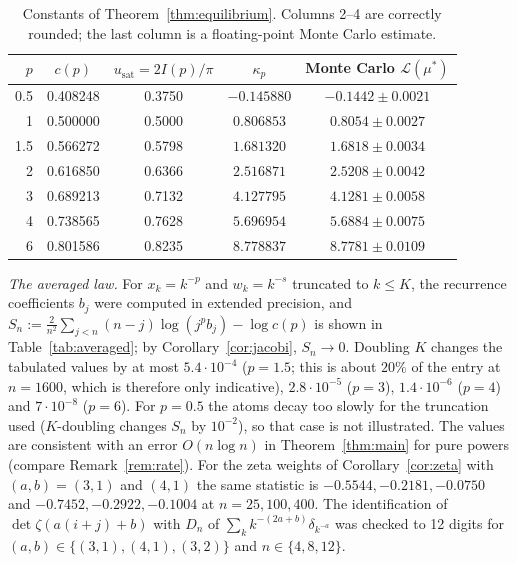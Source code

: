 \documentclass{amsart}
\theoremstyle{definition}
\theoremstyle{remark}
\numberwithin{equation}{section}
\newcommand{\cL}{\mathcal{L}}
\newcommand{\usat}{u_{\mathrm{sat}}}
\begin{document}
\begin{table}[ht]
\centering
\begin{tabular}{rcccc}
\hline
$p$ & $c(p)$ & $\usat=2I(p)/\pi$ & $\kappa_p$ & Monte Carlo $\cL(\mu^*)$\\
\hline
0.5 & 0.408248 & 0.3750 & $-0.145880$ & $-0.1442\pm0.0021$\\
1   & 0.500000 & 0.5000 & $0.806853$ & $0.8054\pm0.0027$\\
1.5 & 0.566272 & 0.5798 & $1.681320$ & $1.6818\pm0.0034$\\
2   & 0.616850 & 0.6366 & $2.516871$ & $2.5208\pm0.0042$\\
3   & 0.689213 & 0.7132 & $4.127795$ & $4.1281\pm0.0058$\\
4   & 0.738565 & 0.7628 & $5.696954$ & $5.6884\pm0.0075$\\
6   & 0.801586 & 0.8235 & $8.778837$ & $8.7781\pm0.0109$\\
\hline
\end{tabular}
\caption{Constants of Theorem~\ref{thm:equilibrium}. Columns 2--4 are correctly rounded; the last column is a
floating-point Monte Carlo estimate.}
\label{tab:constants}
\end{table}

\emph{The averaged law.} For $x_k=k^{-p}$ and $w_k=k^{-s}$ truncated to $k\le K$, the recurrence coefficients $b_j$
were computed in extended precision, and
$S_n:=\frac{2}{n^2}\sum_{j<n}(n-j)\log(j^pb_j)-\log c(p)$ is shown in Table~\ref{tab:averaged}; by
Corollary~\ref{cor:jacobi}, $S_n\to0$. Doubling $K$ changes the tabulated values by at most $5.4\cdot10^{-4}$
($p=1.5$; this is about $20\%$ of the entry at $n=1600$, which is therefore only indicative),
$2.8\cdot10^{-5}$ ($p=3$), $1.4\cdot10^{-6}$ ($p=4$) and $7\cdot10^{-8}$ ($p=6$). For $p=0.5$ the atoms
decay too slowly for the truncation used ($K$-doubling changes $S_n$ by $10^{-2}$), so that case is not illustrated.
The values are consistent with an error $O(n\log n)$ in Theorem~\ref{thm:main} for pure powers (compare
Remark~\ref{rem:rate}). For the zeta weights of Corollary~\ref{cor:zeta} with $(a,b)=(3,1)$ and $(4,1)$ the same
statistic is $-0.5544,-0.2181,-0.0750$ and $-0.7452,-0.2922,-0.1004$ at $n=25,100,400$. The identification of
$\det\zeta(a(i+j)+b)$ with $D_n$ of $\sum_kk^{-(2a+b)}\delta_{k^{-a}}$ was checked to 12 digits for
$(a,b)\in\{(3,1),(4,1),(3,2)\}$ and $n\in\{4,8,12\}$.
\end{document}
